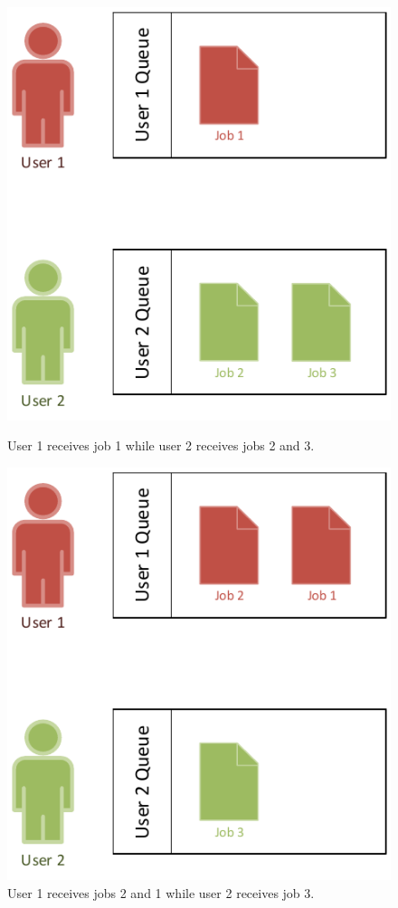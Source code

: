 \begin{figure}[!ht]
	\centering
	\begin{minipage}[b]{0.45\textwidth}
		\includegraphics[width=\textwidth]{img/user_job_assignment_order}
		\caption{User 1 receives job 1 while user 2 receives jobs 2 and 3.}
		\label{fig:user_job_assignment_order}
	\end{minipage}
	\hfill
	\begin{minipage}[b]{0.45\textwidth}
		\includegraphics[width=\textwidth]{img/user_job_assignment_order2}
		\caption{User 1 receives jobs 2 and 1 while user 2 receives job 3.}
		\label{fig:user_job_assignment_order2}
	\end{minipage}
\end{figure}

